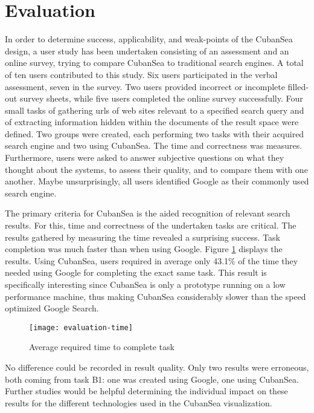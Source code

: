 \section{Evaluation}
In order to determine success, applicability, and weak-points of the CubanSea design, a user study has been undertaken consisting of an assessment and an online survey, trying to compare CubanSea to traditional search engines. A total of ten users contributed to this study. Six users participated in the verbal assessment, seven in the survey. Two users provided incorrect or incomplete filled-out survey sheets, while five users completed the online survey successfully. Four small tasks of gathering urls of web sites relevant to a specified search query and of extracting information hidden within the documents of the result space were defined. Two groups were created, each performing two tasks with their acquired search engine and two using CubanSea. The time and correctness was measures. Furthermore, users were asked to answer subjective questions on what they thought about the systems, to assess their quality, and to compare them with one another. Maybe unsurprisingly, all users identified Google as their commonly used search engine.

The primary criteria for CubanSea is the aided recognition of relevant search results. For this, time and correctness of the undertaken tasks are critical. The results gathered by measuring the time revealed a surprising success. Task completion was much faster than when using Google. Figure \ref{fig:eval:time} displays the results. Using CubanSea, users required in average only 43.1\% of the time they needed using Google for completing the exact same task. This result is specifically interesting since CubanSea is only a prototype running on a low performance machine, thus making CubanSea considerably slower than the speed optimized Google Search.
\begin{figure}[!t]
	\centering
	\texttt{[image: evaluation-time]}
	\caption{Average required time to complete task}
	\label{fig:eval:time}
\end{figure}
No difference could be recorded in result quality. Only two results were erroneous, both coming from task B1: one was created using Google, one using CubanSea. Further studies would be helpful determining the individual impact on these results for the different technologies used in the CubanSea visualization.

